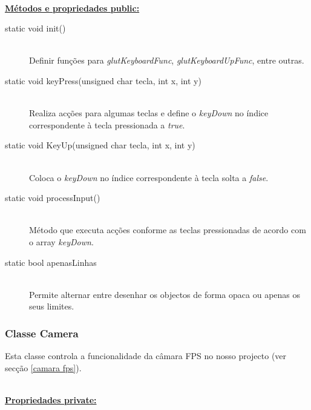 \documentclass[a5paper,onecolumn, 11pt]{article}
\begin{document}
\hfill \\ \underline{\textbf{Métodos e propriedades public:}}

\begin{description}
	\item[static void init()] \hfill \\
	Definir funções para \textit{glutKeyboardFunc}, \textit{glutKeyboardUpFunc}, entre outras.

	\item[static void keyPress(unsigned char tecla, int x, int y)] \hfill \\
	Realiza acções para algumas teclas e define o \textit{keyDown} no índice correspondente à tecla pressionada a \textit{true}.

	\item[static void KeyUp(unsigned char tecla, int x, int y)] \hfill \\
	Coloca o \textit{keyDown} no índice correspondente à tecla solta a \textit{false}.

	\item[static void processInput()] \hfill \\
	Método que executa acções conforme as teclas pressionadas de acordo com o array \textit{keyDown}.

	\item[static bool apenasLinhas] \hfill \\
	Permite alternar entre desenhar os objectos de forma opaca ou apenas os seus limites.
\end{description}

\clearpage
\subsubsection{Classe Camera} \label{classe camera}
Esta classe controla a funcionalidade da câmara FPS no nosso projecto (ver secção \ref{camara fps}).

\hfill \\ \underline{\textbf{Propriedades private:}}
\end{document}
